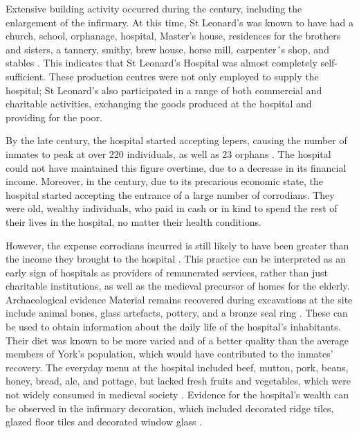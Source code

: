 Extensive building activity occurred during the  century\AD, including the enlargement of the infirmary. At this time, St Leonard’s was known to have had a church, school, orphanage, hospital, Master’s house, residences for the brothers and sisters, a tannery, smithy, brew house, horse mill, carpenter´s shop, and stables 
\parencites[99]{Dean_2008}[116]{Raine_1955}. This indicates that St Leonard’s Hospital was almost completely self-sufficient. These production centres were not only employed to supply the hospital; St Leonard’s also participated in a range of both commercial and charitable activities, exchanging the goods produced at the hospital and providing for the poor.

By the late  century\AD, the hospital started accepting lepers, causing the number of inmates to peak at over \num{220} individuals, as well as 23 orphans \parencites[6,10]{Cullum_1991}[151]{Palliser_2014}. The hospital could not have maintained this figure overtime, due to a decrease in its financial income. 
Moreover, in the  century\AD, due to its precarious economic state, the hospital started accepting the entrance of a large number of corrodians. They were old, wealthy individuals, who paid in cash or in kind to spend the rest of their lives in the hospital, no matter their health conditions. 

However, the expense corrodians incurred is still likely to have been greater than the income they brought to the hospital \parencites[235]{Brodman_2009}[6]{Cullum_1991}. This practice can be interpreted as an early sign of hospitals as providers of remunerated services, rather than just charitable institutions, as well as the medieval precursor of homes for the elderly.
Archaeological evidence
Material remains recovered during excavations at the site include animal bones, glass artefacts, pottery, and a bronze seal ring \parencite{Johnson_2014}. These can be used to obtain information about the daily life of the hospital’s inhabitants. Their diet was known to be more varied and of a better quality than the average members of York’s population, which would have contributed to the inmates’ recovery. 
The everyday menu at the hospital included beef, mutton, pork, beans, honey, bread, ale, and pottage, but lacked fresh fruits and vegetables, which were not widely consumed in medieval society \parencites[16-17]{Cullum_1991}[19]{Cullum_1999}. 
Evidence for the hospital’s wealth can be observed in the infirmary decoration, which included decorated ridge tiles, glazed floor tiles and decorated window glass \parencite[101]{Dean_2008}. 
\IJSRAseparator

